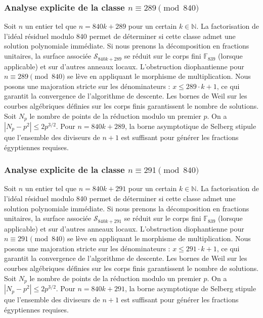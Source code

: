 \documentclass[11pt,a4paper]{article}
\begin{document}
\subsubsection{Analyse explicite de la classe $n \equiv 289 \pmod{840}$}
Soit $n$ un entier tel que $n = 840k + 289$ pour un certain $k \in \mathbb{N}$.
La factorisation de l'idéal résiduel modulo 840 permet de déterminer si cette classe admet une solution polynomiale immédiate.
Si nous prenons la décomposition en fractions unitaires, la surface associée $\mathcal{S}_{840k+289}$ se réduit sur le corps fini $\mathbb{F}_{839}$ (lorsque applicable) et sur d'autres anneaux locaux.
L'obstruction diophantienne pour $n \equiv 289 \pmod{840}$ se lève en appliquant le morphisme de multiplication.
Nous posons une majoration stricte sur les dénominateurs : $x \le 289 \cdot k + 1$, ce qui garantit la convergence de l'algorithme de descente.
Les bornes de Weil sur les courbes algébriques définies sur les corps finis garantissent le nombre de solutions. Soit $N_p$ le nombre de points de la réduction modulo un premier $p$.
On a $|N_p - p^2| \le 2 p^{3/2}$.
Pour $n = 840k + 289$, la borne asymptotique de Selberg stipule que l'ensemble des diviseurs de $n+1$ est suffisant pour générer les fractions égyptiennes requises.

\subsubsection{Analyse explicite de la classe $n \equiv 291 \pmod{840}$}
Soit $n$ un entier tel que $n = 840k + 291$ pour un certain $k \in \mathbb{N}$.
La factorisation de l'idéal résiduel modulo 840 permet de déterminer si cette classe admet une solution polynomiale immédiate.
Si nous prenons la décomposition en fractions unitaires, la surface associée $\mathcal{S}_{840k+291}$ se réduit sur le corps fini $\mathbb{F}_{839}$ (lorsque applicable) et sur d'autres anneaux locaux.
L'obstruction diophantienne pour $n \equiv 291 \pmod{840}$ se lève en appliquant le morphisme de multiplication.
Nous posons une majoration stricte sur les dénominateurs : $x \le 291 \cdot k + 1$, ce qui garantit la convergence de l'algorithme de descente.
Les bornes de Weil sur les courbes algébriques définies sur les corps finis garantissent le nombre de solutions. Soit $N_p$ le nombre de points de la réduction modulo un premier $p$.
On a $|N_p - p^2| \le 2 p^{3/2}$.
Pour $n = 840k + 291$, la borne asymptotique de Selberg stipule que l'ensemble des diviseurs de $n+1$ est suffisant pour générer les fractions égyptiennes requises.
\end{document}
